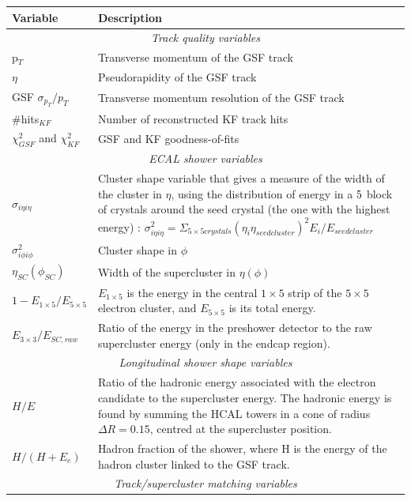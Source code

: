 \begin{center}
\begin{longtable}{|l|p{11cm}|}
\hline
	\textbf{Variable} & \textbf{Description} \\
\hline	
	\multicolumn{2}{|c|}{\emph{Track quality variables}}  \\
\hline
	p$_T$ & Transverse momentum of the GSF track \\
	$\eta$ & Pseudorapidity of the GSF track \\
	GSF $\sigma_{p_T}/p_T$ & Transverse momentum resolution of the GSF track \\
	\#hits$_{KF}$ & Number of reconstructed KF track hits \\
	$\chi^2_{GSF}$ and $\chi^2_{KF}$ & GSF and KF goodness-of-fits \\
\hline	
	\multicolumn{2}{|c|}{\emph{ECAL shower variables}} \\
\hline	
	$\sigma_{i \eta i \eta}$ & Cluster shape variable that gives a measure of the width of the cluster in $\eta$, using the distribution of energy in a $5 \time 5$ block of crystals around the seed crystal (the one with the highest energy) \cite{Baffioni:2006cd}: $\sigma^2_{i \eta i \eta} = \Sigma_{5 \times 5 crystals} (\eta_i \eta_{seed cluster})^2 E_i/E_{seed cluster}$ \\
	$\sigma^2_{i \phi i \phi}$ & Cluster shape in $\phi$ \\
	$\eta_{SC}(\phi_{SC})$ & Width of the supercluster in $\eta (\phi)$ \\
	$1-E_{1 \times 5}/E_{5 \times 5}$ & $E_{1 \times 5}$ is the energy in the central $1 \times 5$ strip of the $5 \times 5$ electron cluster, and $E_{5 \times 5}$ is its total energy. \\
	$E_{3 \times 3}/E_{SC,raw}$ & Ratio of the energy in the preshower detector to the raw supercluster energy (only in the endcap region). \\
\hline	
	\multicolumn{2}{|c|}{\emph{Longitudinal shower shape variables}} \\
\hline	
	$H/E$ & Ratio of the hadronic energy associated with the electron candidate to the supercluster energy. The hadronic energy is found by summing the HCAL towers in a cone of radius $\Delta R = 0.15$, centred at the supercluster position. \\
	$H/(H+E_{e})$ & Hadron fraction of the shower, where H is the energy of the hadron cluster linked to the GSF track.\\
\hline	
	\multicolumn{2}{|c|}{\emph{Track/supercluster matching variables}}\\

\end{longtable}
\end{center}
